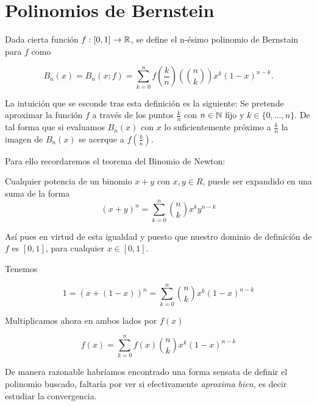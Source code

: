 %

\chapter{Polinomios de Bernstein}\label{ch:Bernstein}

\begin{definicion} \label{def:Bernstein}
    Dada cierta función $f: [0,1] \rightarrow \mathbb{R}$, se define el n-ésimo polinomio de Bernstain para $f$ como 

    $$B_n(x) = B_n(x;f)=\sum_ {k=0}^{n} f \left( \frac{k}{n} \right) \left( \binom{n}{k} \right) x^k (1-x)^{n-k}.$$

\end{definicion}

La intuición que se esconde tras esta definición es la siguiente: 
Se pretende aproximar la función $f$ a través de los puntos $\frac{k}{n}$ con $n \in \mathbb{N}$ fijo
y $k \in \{0,...,n \}.$
De tal forma que si evaluamos $B_n(x)$ con $x$ lo suficientemente próximo a  $\frac{k}{n}$  
la imagen de $B_n(x)$ se acerque a $f \left( \frac{k}{n} \right).$

Para ello recordaremos el teorema del Binomio de Newton: 

\begin{teorema}
    Cualquier potencia de un binomio $x+y$ con $x,y \in R$,  puede ser expandido en una suma de la forma
    \[(x+y)^n = \sum_{k=0}^n \binom{n}{k} x^{k}y^{n-k}\]
\end{teorema}

Así pues en virtud de esta igualdad y puesto que nuestro dominio de definición de $f$ es $[0,1]$, para cualquier $x \in [0,1].$

Tenemos 

\begin{equation}\label{eq:uno_igual_binomio}
    1 = (x+ (1-x))^n = \sum_{k=0}^n \binom{n}{k} x^{k} (1-x)^{n-k}
\end{equation}

Multiplicamos ahora en ambos lados por $f(x)$

\begin{equation}
    f(x) = \sum_{k=0}^n f(x) \binom{n}{k} x^{k} (1-x)^{n-k}
\end{equation} 

De manera razonable habríamos encontrado una forma sensata de definir el polinomio buscado, 
faltaría por ver  si efectivamente \textit{aproxima bien}, es decir estudiar la convergencia. 

